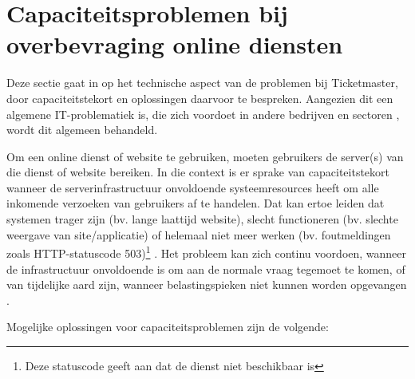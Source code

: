 
\section{Capaciteitsproblemen bij overbevraging online diensten}

Deze sectie gaat in op het technische aspect van de problemen bij Ticketmaster,
door capaciteitstekort en oplossingen daarvoor te bespreken. Aangezien dit
een algemene IT-problematiek is, die zich voordoet in andere bedrijven en
sectoren \cite{warren2023chatgpt, warren2020discord, reuters2023what},
wordt dit algemeen behandeld. 

Om een online dienst of website te gebruiken, moeten gebruikers de
server(s) van die dienst of website bereiken. In die context is er sprake van
capaciteitstekort wanneer de serverinfrastructuur onvoldoende systeemresources
heeft om alle inkomende verzoeken van gebruikers af te handelen.
Dat kan ertoe leiden dat systemen trager zijn (bv. lange laattijd website),
slecht functioneren (bv. slechte weergave van site/applicatie) of
helemaal niet meer werken (bv. foutmeldingen zoals HTTP-statuscode
503)\footnote{Deze statuscode geeft aan dat de dienst niet beschikbaar is}
\cite{guitart2010survey, guitart2007designing}.
Het probleem kan zich continu voordoen, wanneer de infrastructuur onvoldoende
is om aan de normale vraag tegemoet te komen,
of van tijdelijke aard zijn, wanneer belastingspieken niet kunnen worden
opgevangen \cite{schroeder2006web}.

Mogelijke oplossingen voor capaciteitsproblemen zijn de volgende:

